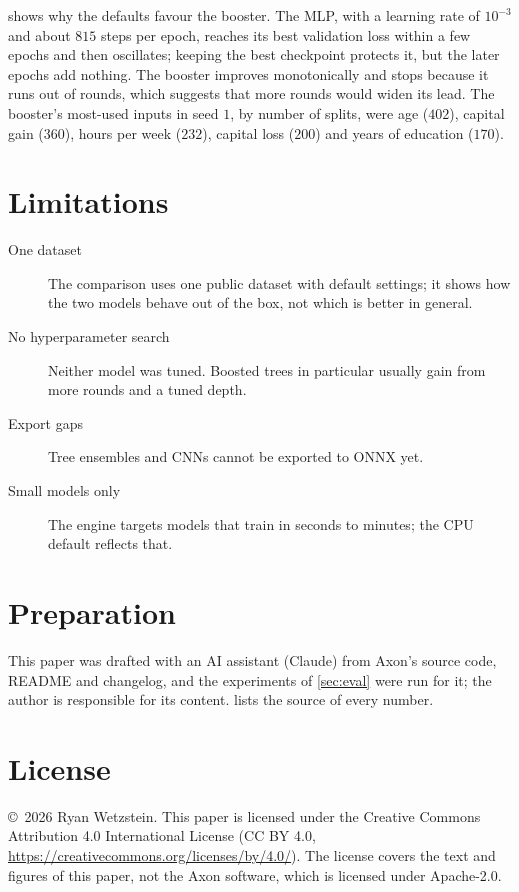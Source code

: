 \documentclass[11pt]{article}
\theoremstyle{plain}
\theoremstyle{definition}
\begin{document}
 shows why the defaults favour the booster. The MLP,
with a learning rate of $10^{-3}$ and about $815$ steps per epoch, reaches its best
validation loss within a few epochs and then oscillates; keeping the best
checkpoint protects it, but the later epochs add nothing. The booster improves
monotonically and stops because it runs out of rounds, which suggests that more
rounds would widen its lead. The booster's most-used inputs in seed $1$, by
number of splits, were age ($402$), capital gain ($360$), hours per week
($232$), capital loss ($200$) and years of education ($170$).

\section{Limitations}\label{sec:limits}

\begin{description}
  \item[One dataset] The comparison uses one public dataset with default
        settings; it shows how the two models behave out of the box, not which
        is better in general.
  \item[No hyperparameter search] Neither model was tuned. Boosted trees in
        particular usually gain from more rounds and a tuned depth.
  \item[Export gaps] Tree ensembles and CNNs cannot be exported to ONNX yet.
  \item[Small models only] The engine targets models that train in seconds to
        minutes; the CPU default reflects that.
\end{description}

\section*{Preparation}

This paper was drafted with an AI assistant (Claude) from Axon's source code,
README and changelog, and the experiments of \cref{sec:eval} were run for it;
the author is responsible for its content.  lists the
source of every number.

\section*{License}

\copyright\ 2026 Ryan Wetzstein. This paper is licensed under the Creative
Commons Attribution 4.0 International License (CC BY 4.0,
\url{https://creativecommons.org/licenses/by/4.0/}). The license covers the
text and figures of this paper, not the Axon software, which is licensed under
Apache-2.0.
\end{document}
